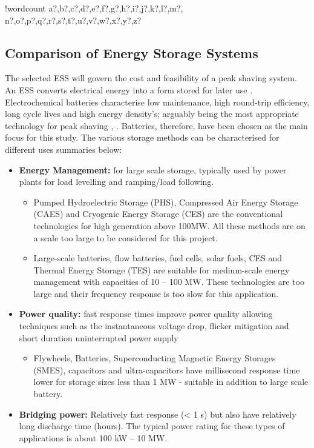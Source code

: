 \documentclass[fontsize=9.5pt]{extarticle}
\numberwithin{figure}{section} %
\providecommand{\tightlist}{%
  \setlength{\itemsep}{0pt}\setlength{\parskip}{0pt}}
\newcounter{words}
\newenvironment{counted}{%
  \setcounter{words}{0}
  \SearchList!{wordcount}{\stepcounter{words}}
    {a?,b?,c?,d?,e?,f?,g?,h?,i?,j?,k?,l?,m?,
    n?,o?,p?,q?,r?,s?,t?,u?,v?,w?,x?,y?,z?}
  \UndoBoundary{'}
  \SearchOrder{p;}}{%
  \StopSearching}
\begin{document}
\begin{counted}
\subsection{Comparison of Energy Storage
Systems}\label{comparison-of-energy-storage-systems}

The selected ESS will govern the cost and feasibility of a peak shaving
system. An ESS converts electrical energy into a form stored for later
use \cite{Chen2009291}. Electrochemical batteries characterise low
maintenance, high round-trip efficiency, long cycle lives and high
energy density's; arguably being the most appropriate technology for
peak shaving \cite{liao2016a}, \cite{Dunn928}. Batteries, therefore,
have been chosen as the main focus for this study. The various storage
methods can be characterised for different uses summaries below:

\begin{itemize}
\tightlist
\item
  \textbf{Energy Management:} for large scale storage, typically used by
  power plants for load levelling and ramping/load following.

  \begin{itemize}
  \tightlist
  \item
    Pumped Hydroelectric Storage (PHS), Compressed Air Energy Storage
    (CAES) and Cryogenic Energy Storage (CES) are the conventional
    technologies for high generation above 100MW. All these methods are
    on a scale too large to be considered for this project.
  \item
    Large-scale batteries, flow batteries, fuel cells, solar fuels, CES
    and Thermal Energy Storage (TES) are suitable for medium-scale
    energy management with capacities of 10 -- 100 MW. These
    technologies are too large and their frequency response is too slow
    for this application.
  \end{itemize}
\item
  \textbf{Power quality:} fast response times improve power quality
  allowing techniques such as the instantaneous voltage drop, flicker
  mitigation and short duration uninterrupted power supply

  \begin{itemize}
  \tightlist
  \item
    Flywheels, Batteries, Superconducting Magnetic Energy Storages
    (SMES), capacitors and ultra-capacitors have millisecond response
    time lower for storage sizes less than 1 MW - suitable in addition
    to large scale battery.
  \end{itemize}
\item
  \textbf{Bridging power:} Relatively fast response (\textless{} 1 s)
  but also have relatively long discharge time (hours). The typical
  power rating for these types of applications is about 100 kW -- 10 MW.


\end{itemize}
\end{counted}
\end{document}
